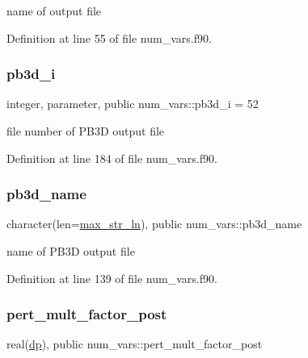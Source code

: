 name of output file 



Definition at line 55 of file num\+\_\+vars.\+f90.

\mbox{\label{namespacenum__vars_aa59942bdbb47a383030d0bcc21e1a3c0}} 
\subsubsection{\texorpdfstring{pb3d\+\_\+i}{pb3d\_i}}
{\footnotesize\ttfamily integer, parameter, public num\+\_\+vars\+::pb3d\+\_\+i = 52}



file number of P\+B3D output file 



Definition at line 184 of file num\+\_\+vars.\+f90.

\mbox{\label{namespacenum__vars_a8b3ab3b12cddc0c3e60c3430912b5f3c}} 
\subsubsection{\texorpdfstring{pb3d\+\_\+name}{pb3d\_name}}
{\footnotesize\ttfamily character(len=\hyperlink{namespacenum__vars_a3ff2bb983ee80a6735277d6789e6ce7c}{max\+\_\+str\+\_\+ln}), public num\+\_\+vars\+::pb3d\+\_\+name}



name of P\+B3D output file 



Definition at line 139 of file num\+\_\+vars.\+f90.

\mbox{\label{namespacenum__vars_aa53d6f71e297c4d8be05907bb7dbffce}} 
\subsubsection{\texorpdfstring{pert\+\_\+mult\+\_\+factor\+\_\+post}{pert\_mult\_factor\_post}}
{\footnotesize\ttfamily real(\hyperlink{namespacenum__vars_a03802aa2bd86439d7a9370836fabf3f2}{dp}), public num\+\_\+vars\+::pert\+\_\+mult\+\_\+factor\+\_\+post}



